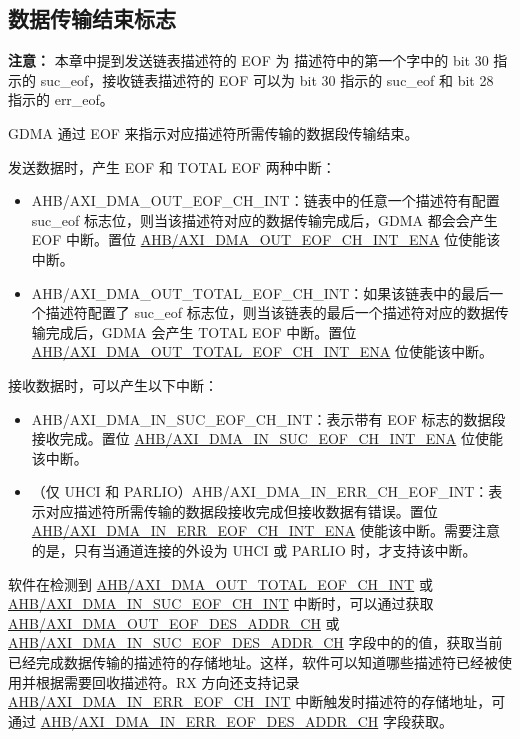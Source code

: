 \documentclass[main\_\_CN.tex]{subfiles}
\begin{document}
\subsection{数据传输结束标志}

{\bfseries 注意：} 本章中提到发送链表描述符的 EOF 为 描述符中的第一个字中的 bit 30 指示的 suc\_eof，接收链表描述符的 EOF 可以为 bit 30 指示的 suc\_eof 和 bit 28 指示的 err\_eof。

GDMA 通过 EOF 来指示对应描述符所需传输的数据段传输结束。

发送数据时，产生 EOF 和 TOTAL EOF 两种中断：
\begin{itemize}
    \item AHB/AXI\_DMA\_OUT\_EOF\_CH\_INT：链表中的任意一个描述符有配置 suc\_eof 标志位，则当该描述符对应的数据传输完成后，GDMA 都会会产生 EOF 中断。置位 \hyperref[fielddesc:AHBDMAOUTEOFCHNINTENA]{AHB/AXI\_DMA\_OUT\_EOF\_CH\_INT\_ENA} 位使能该中断。
    \item AHB/AXI\_DMA\_OUT\_TOTAL\_EOF\_CH\_INT：如果该链表中的最后一个描述符配置了 suc\_eof 标志位，则当该链表的最后一个描述符对应的数据传输完成后，GDMA 会产生 TOTAL EOF 中断。置位 \hyperref[fielddesc:AHBDMAOUTTOTALEOFCHNINTENA]{AHB/AXI\_DMA\_OUT\_TOTAL\_EOF\_CH\_INT\_ENA} 位使能该中断。
\end{itemize}


接收数据时，可以产生以下中断：
\begin{itemize}
    \item AHB/AXI\_DMA\_IN\_SUC\_EOF\_CH\_INT：表示带有 EOF 标志的数据段接收完成。置位 \hyperref[fielddesc:AHBDMAINSUCEOFCHNINTENA]{AHB/AXI\_DMA\_IN\_SUC\_EOF\_CH\_INT\_ENA} 位使能该中断。
    \item（仅 UHCI 和 PARLIO）AHB/AXI\_DMA\_IN\_ERR\_CH\_EOF\_INT：表示对应描述符所需传输的数据段接收完成但接收数据有错误。置位 \hyperref[fielddesc:AHBDMAINERREOFCHNINTENA]{AHB/AXI\_DMA\_IN\_ERR\_EOF\_CH\_INT\_ENA} 使能该中断。需要注意的是，只有当通道连接的外设为 UHCI 或 PARLIO 时，才支持该中断。
\end{itemize}


软件在检测到 \hyperref[int:GDMAOUTTOTALEOFINT]{AHB/AXI\_DMA\_OUT\_TOTAL\_EOF\_CH\_INT} 或 \hyperref[int:GDMAINSUCEOFINT]{AHB/AXI\_DMA\_IN\_SUC\_EOF\_CH\_INT} 中断时，可以通过获取 \hyperref[fielddesc:AHBDMAOUTEOFDESADDRCHN]{AHB/AXI\_DMA\_OUT\_EOF\_DES\_ADDR\_CH} 或 \hyperref[fielddesc:AHBDMAINSUCEOFDESADDRCHN]{AHB/AXI\_DMA\_IN\_SUC\_EOF\_DES\_ADDR\_CH} 字段中的的值，获取当前已经完成数据传输的描述符的存储地址。这样，软件可以知道哪些描述符已经被使用并根据需要回收描述符。RX 方向还支持记录 \hyperref[int:GDMAINERREOFINT]{AHB/AXI\_DMA\_IN\_ERR\_EOF\_CH\_INT} 中断触发时描述符的存储地址，可通过 \hyperref[fielddesc:AHBDMAINERREOFDESADDRCHN]{AHB/AXI\_DMA\_IN\_ERR\_EOF\_DES\_ADDR\_CH} 字段获取。
\end{document}
